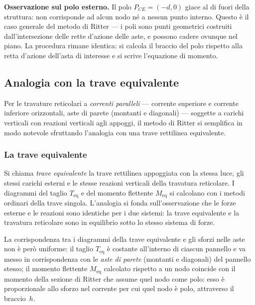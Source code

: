 \begin{esempio}
\begin{svolgimento}
		\noindent\textbf{Osservazione sul polo esterno.}
		Il polo $P_{CE} = (-d,0)$ giace al di fuori della
		struttura: non corrisponde ad alcun nodo né a
		nessun punto interno. Questo è il caso generale
		del metodo di Ritter --- i poli sono punti
		geometrici costruiti dall'intersezione delle rette
		d'azione delle aste, e possono cadere ovunque nel
		piano. La procedura rimane identica: si calcola
		il braccio del polo rispetto alla retta d'azione
		dell'asta di interesse e si scrive l'equazione di
		momento.
	\end{svolgimento}
\end{esempio}

\subsection{Analogia con la trave equivalente}
\label{sec:trave_equivalente}

Per le travature reticolari a \emph{correnti paralleli}
--- corrente superiore e corrente inferiore orizzontali,
aste di parete (montanti e diagonali) --- soggette a
carichi verticali con reazioni verticali agli appoggi,
il metodo di Ritter si semplifica in modo notevole
sfruttando l'analogia con una trave rettilinea
equivalente.

\subsubsection{La trave equivalente}
\label{subsec:trave_equiv_def}

Si chiama \emph{trave equivalente} la trave rettilinea
appoggiata con la stessa luce, gli stessi carichi
esterni e le stesse reazioni verticali della travatura
reticolare. I diagrammi del taglio $T_\text{eq}$
e del momento flettente $M_\text{eq}$ si calcolano
con i metodi ordinari della trave singola.
L'analogia si fonda sull'osservazione che le forze
esterne e le reazioni sono identiche per i due sistemi:
la trave equivalente e la travatura reticolare sono
in equilibrio sotto lo stesso sistema di forze.

La corrispondenza tra i diagrammi della trave
equivalente e gli sforzi nelle aste non è però
uniforme: il taglio $T_\text{eq}$ è costante
all'interno di ciascun pannello e va messo in
corrispondenza con le \emph{aste di parete}
(montanti e diagonali) del pannello stesso;
il momento flettente $M_\text{eq}$ calcolato
rispetto a un nodo coincide con il momento
della sezione di Ritter che assume quel nodo
come polo: esso è proporzionale allo sforzo
nel corrente per cui quel nodo è polo,
attraverso il braccio~$h$.

